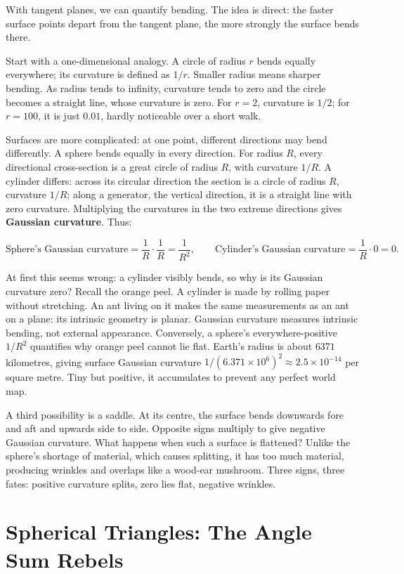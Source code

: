 With tangent planes, we can quantify bending. The idea is direct: the faster surface points depart from the tangent plane, the more strongly the surface bends there.

Start with a one-dimensional analogy. A circle of radius $r$ bends equally everywhere; its curvature is defined as $1/r$. Smaller radius means sharper bending. As radius tends to infinity, curvature tends to zero and the circle becomes a straight line, whose curvature is zero. For $r=2$, curvature is $1/2$; for $r=100$, it is just $0.01$, hardly noticeable over a short walk.

Surfaces are more complicated: at one point, different directions may bend differently. A sphere bends equally in every direction. For radius $R$, every directional cross-section is a great circle of radius $R$, with curvature $1/R$. A cylinder differs: across its circular direction the section is a circle of radius $R$, curvature $1/R$; along a generator, the vertical direction, it is a straight line with zero curvature. Multiplying the curvatures in the two extreme directions gives \textbf{Gaussian curvature}. Thus:

\[ \text{Sphere's Gaussian curvature} = \frac{1}{R}\cdot\frac{1}{R} = \frac{1}{R^2}, \qquad \text{Cylinder's Gaussian curvature} = \frac{1}{R}\cdot 0 = 0. \]

At first this seems wrong: a cylinder visibly bends, so why is its Gaussian curvature zero? Recall the orange peel. A cylinder is made by rolling paper without stretching. An ant living on it makes the same measurements as an ant on a plane: its intrinsic geometry is planar. Gaussian curvature measures intrinsic bending, not external appearance. Conversely, a sphere's everywhere-positive $1/R^2$ quantifies why orange peel cannot lie flat. Earth's radius is about $6371$ kilometres, giving surface Gaussian curvature $1/(6.371\times 10^6)^2 \approx 2.5\times 10^{-14}$ per square metre. Tiny but positive, it accumulates to prevent any perfect world map.

A third possibility is a saddle. At its centre, the surface bends downwards fore and aft and upwards side to side. Opposite signs multiply to give negative Gaussian curvature. What happens when such a surface is flattened? Unlike the sphere's shortage of material, which causes splitting, it has too much material, producing wrinkles and overlaps like a wood-ear mushroom. Three signs, three fates: positive curvature splits, zero lies flat, negative wrinkles.

\section{Spherical Triangles: The Angle Sum Rebels}

